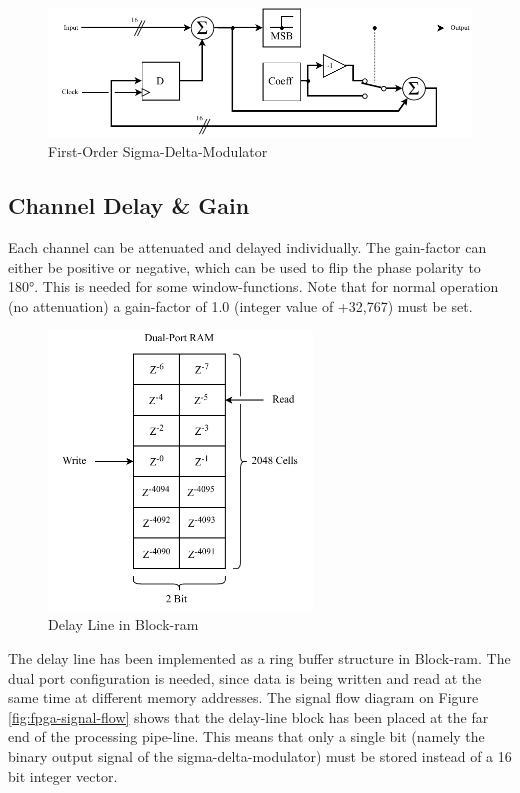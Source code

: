 \begin{figure}[h!]
    \centering
    \includegraphics[width=\textwidth]{images/4_Design/FPGA/Sigma-Delta-Modulator.pdf}
    \caption{First-Order Sigma-Delta-Modulator}
    \label{4_fig:fpga_Sigma-delta-modulator}
\end{figure}

\subsection{Channel Delay \& Gain}
Each channel can be attenuated and delayed individually. The gain-factor can either be positive or negative, which can be used to flip the phase polarity to 180°. This is needed for some window-functions. Note that for normal operation (no attenuation) a gain-factor of 1.0 (integer value of +32,767) must be set.

\bigskip
\begin{figure}
    \vspace{-0.7cm}
    \includegraphics[width=7cm]{images/4_Design/FPGA/Delay-Line Block.pdf}
    \vspace{-0.4cm}
    \caption{Delay Line in Block-\acrshort{ram}}
    \label{fig:fpga_delay_line}
\end{figure}

The delay line has been implemented as a ring buffer structure in Block-\acrshort{ram}. The dual port configuration is needed, since data is being written and read at the same time at different memory addresses. The signal flow diagram on Figure \ref{fig:fpga-signal-flow} shows that the delay-line block has been placed at the far end of the processing pipe-line. This means that only a single bit (namely the binary output signal of the sigma-delta-modulator) must be stored instead of a 16 bit integer vector.
\newpage

